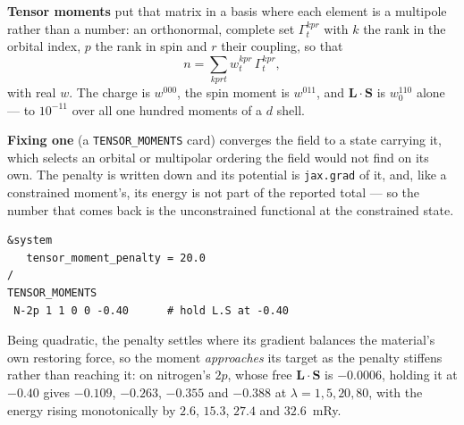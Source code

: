 \documentclass[11pt,a4paper]{article}
\newcommand{\code}[1]{\texttt{\small #1}}
\begin{document}
\textbf{Tensor moments} put that matrix in a basis where each element is a
multipole rather than a number: an orthonormal, complete set $\Gamma^{kpr}_t$
with $k$ the rank in the orbital index, $p$ the rank in spin and $r$ their
coupling, so that
%
\[
  n = \sum_{kprt} w^{kpr}_t \, \Gamma^{kpr}_t ,
\]
%
with real $w$. The charge is $w^{000}$, the spin moment is $w^{011}$, and
$\mathbf{L}\cdot\mathbf{S}$ is $w^{110}_0$ alone --- to $10^{-11}$ over all one
hundred moments of a $d$ shell.

\textbf{Fixing one} (a \code{TENSOR\_MOMENTS} card) converges the field to a
state carrying it, which selects an orbital or multipolar ordering the field
would not find on its own. The penalty is written down and its potential is
\code{jax.grad} of it, and, like a constrained moment's, its energy is not part
of the reported total --- so the number that comes back is the unconstrained
functional at the constrained state.

\begin{lstlisting}
&system
   tensor_moment_penalty = 20.0
/
TENSOR_MOMENTS
 N-2p 1 1 0 0 -0.40      # hold L.S at -0.40
\end{lstlisting}

Being quadratic, the penalty settles where its gradient balances the material's
own restoring force, so the moment \emph{approaches} its target as the penalty
stiffens rather than reaching it: on nitrogen's $2p$, whose free
$\mathbf{L}\cdot\mathbf{S}$ is $-0.0006$, holding it at $-0.40$ gives $-0.109$,
$-0.263$, $-0.355$ and $-0.388$ at $\lambda = 1, 5, 20, 80$, with the energy
rising monotonically by $2.6$, $15.3$, $27.4$ and $32.6$~mRy.
\end{document}
